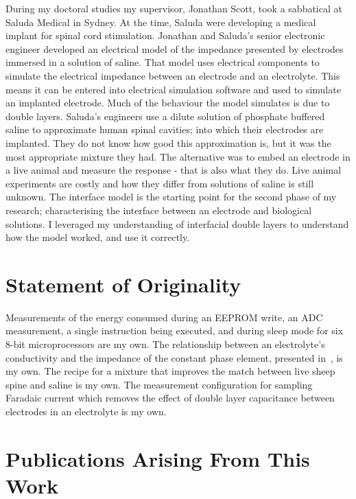   During my doctoral studies my supervisor, Jonathan Scott, took a sabbatical at Saluda Medical in Sydney.
  At the time, Saluda were developing a medical implant for spinal cord stimulation.
  Jonathan and Saluda's senior electronic engineer developed an electrical model of the impedance presented by electrodes immersed in a solution of saline.
  That model uses electrical components to simulate the electrical impedance between an electrode and an electrolyte.
  This means it can be entered into electrical simulation software and used to simulate an implanted electrode.
  Much of the behaviour the model simulates is due to double layers.
  Saluda's engineers use a dilute solution of phosphate buffered saline to approximate human spinal cavities; into which their electrodes are implanted.
  They do not know how good this approximation is, but it was the most appropriate mixture they had.
  The alternative was to embed an electrode in a live animal and measure the response - that is also what they do.
  Live animal experiments are costly and how they differ from solutions of saline is still unknown.
  The interface model is the starting point for the second phase of my research; characterising the interface between an electrode and biological solutions.
  I leveraged my understanding of interfacial double layers to understand how the model worked, and use it correctly.


\section{Statement of Originality}


  Measurements of the energy consumed during an EEPROM write, an ADC measurement, a single instruction being executed, and during sleep mode for six 8-bit microprocessors are my own.
  The relationship between an electrolyte's conductivity and the impedance of the constant phase element, presented in~, is my own.
  The recipe for a mixture that improves the match between live sheep spine and saline is my own.
  The measurement configuration for sampling Faradaic current which removes the effect of double layer capacitance between electrodes in an electrolyte is my own.


\section{Publications Arising From This Work}



